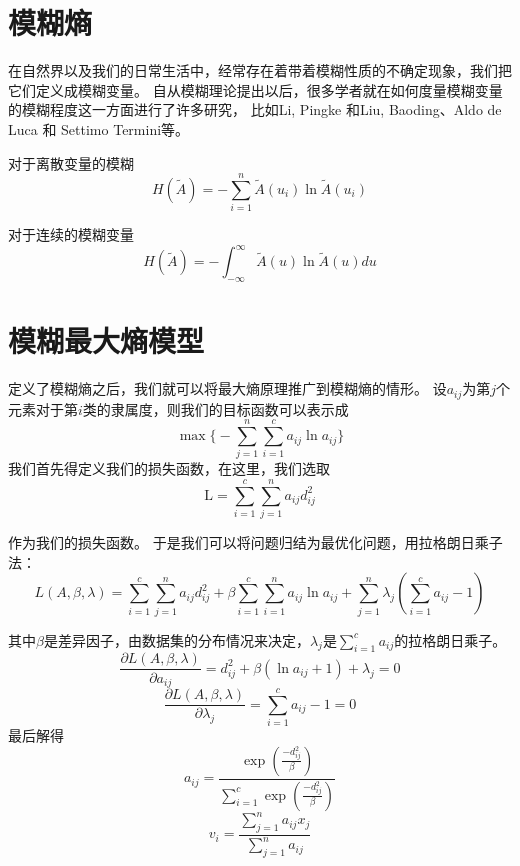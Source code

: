 \section{模糊熵}
在自然界以及我们的日常生活中，经常存在着带着模糊性质的不确定现象，我们把它们定义成模糊变量。
自从模糊理论提出以后，很多学者就在如何度量模糊变量的模糊程度这一方面进行了许多研究，
比如Li, Pingke 和Liu, Baoding\cite{li2008entropy}、Aldo de Luca 和 Settimo Termini\cite{RN3}等。
\begin{definition}[模糊熵]
    对于离散变量的模糊
    \begin{equation}
        H(\tilde{A})=-\sum_{i=1}^{n}\tilde{A}(u_i) \ln \tilde{A}(u_i)
    \end{equation}

    对于连续的模糊变量
    \begin{equation}
        H(\tilde{A})=-\int_{-\infty}^{\infty}\tilde{A}(u) \ln \tilde{A}(u) d u
    \end{equation}

\end{definition}

\newpage
\section{模糊最大熵模型}
定义了模糊熵之后，我们就可以将最大熵原理推广到模糊熵的情形。
设$a_{i j}$为第$j$个元素对于第$i$类的隶属度，则我们的目标函数可以表示成
\begin{equation}
    \max \biggl\{-\sum_{j=1}^{n} \sum_{i=1}^{c} a_{i j}\ln a_{i j}\biggr\}
    \label{MEC}
\end{equation}
我们首先得定义我们的损失函数，在这里，我们选取
\begin{equation*}
    \mathrm{L}=\sum_{i=1}^{c} \sum_{j=1}^{n}a_{i j} d_{i j}^2
\end{equation*}

作为我们的损失函数。
于是我们可以将问题归结为最优化问题，用拉格朗日乘子法：
\begin{equation}
    L(A,\beta ,\lambda)=\sum_{i=1}^{c} \sum_{j=1}^{n} a_{i j} d_{i j}^2+\beta \sum_{i=1}^{c} \sum_{i=1}^{n} a_{i j} \ln a_{i j}+\sum_{j=1}^{n} \lambda_{j}\left(\sum_{i=1}^{c} a_{i j}-1\right)
    \label{MLagrange}
\end{equation}

其中$\beta$是差异因子，由数据集的分布情况来决定，$\lambda_j$是$\sum\limits_{i=1}^{c} a_{i j}$的拉格朗日乘子。
\begin{equation}
    \frac{\partial L(A,\beta ,\lambda) }{\partial a_{i j}} =d_{i j}^2+\beta(\ln a_{i j}+1)+\lambda_j=0
\end{equation}
\begin{equation}
    \frac{\partial L(A,\beta ,\lambda)}{\partial \lambda_j}=\sum_{i=1}^{c} a_{i j}-1=0
\end{equation}
最后解得
\begin{equation}
    a_{i j}=\frac{ \exp(\frac{-d_{i j}^2}{\beta})}{\sum\limits_{i=1}^c\exp(\frac{-d_{i j}^2}{\beta})}
    \label{Maij}
\end{equation}
\begin{equation}
    v_i =\frac{\sum\limits_{j=1}^n a_{i j} x_j}{\sum\limits_{j=1}^n a_{i j}}
    \label{Mvij}
\end{equation}
